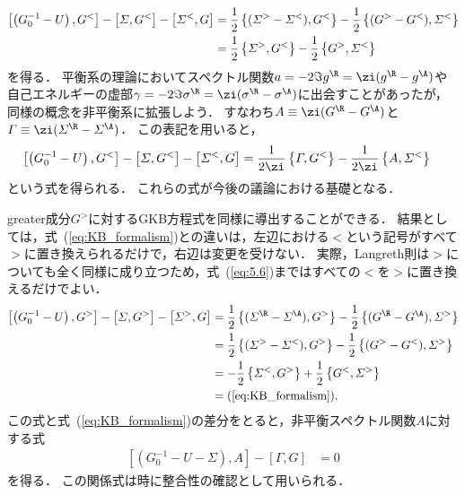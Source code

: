 \documentclass[a4paper,10pt]{jsarticle}
\begin{document}
\begin{align}
\left[ \left( G_0^{-1} - U \right), G^{<} \right]
	- \left[ \varSigma, G^{<} \right]
	- \left[ \varSigma^{<}, G \right]
	& = \frac{1}{2} \left\{ ( \varSigma^{>} - \varSigma^{<} ), G^{<} \right\}
		- \frac{1}{2} \left\{ ( G^{>} - G^{<} ), \varSigma^{<} \right\}
\notag \\
	& = \frac{1}{2} \left\{ \varSigma^{>}, G^{<} \right\}
		- \frac{1}{2} \left\{ G^{>}, \varSigma^{<} \right\}
\label{eq:KB_formalism}
\end{align}
を得る．
平衡系の理論においてスペクトル関数$a = - 2 \Im g^{\R} = \zi ( g^{\R} - g^{\A} )$や自己エネルギーの虚部$\gamma = - 2 \Im \sigma^{\R} = \zi (\sigma^{\R} - \sigma^{\A})$に出会すことがあったが，同様の概念を非平衡系に拡張しよう．
すなわち$A \equiv \zi (G^{\R} - G^{\A})$と$\varGamma \equiv \zi (\varSigma^{\R} - \varSigma^{\A})$．
この表記を用いると，
\begin{align*}
\left[ \left( G_0^{-1} - U \right), G^{<} \right]
	- \left[ \varSigma, G^{<} \right]
	- \left[ \varSigma^{<}, G \right]
	& = \frac{1}{2\zi} \left\{ \varGamma, G^{<} \right\}
		- \frac{1}{2\zi} \left\{ A, \varSigma^{<} \right\}
\end{align*}
という式を得られる．
これらの式が今後の議論における基礎となる．

greater成分$G^{>}$に対するGKB方程式を同様に導出することができる．
結果としては，式~(\ref{eq:KB_formalism})との違いは，左辺における$<$という記号がすべて$>$に置き換えられるだけで，右辺は変更を受けない．
実際，Langreth則は$>$についても全く同様に成り立つため，式~(\ref{eq:5.6})まではすべての$<$を$>$に置き換えるだけでよい．
\begin{align*}
\left[ \left( G_0^{-1} - U \right), G^{>} \right]
	- \left[ \varSigma, G^{>} \right]
	- \left[ \varSigma^{>}, G \right]
	& = \frac{1}{2} \left\{ ( \varSigma^{\R} - \varSigma^{\A} ), G^{>} \right\}
		- \frac{1}{2} \left\{ ( G^{\R} - G^{\A} ), \varSigma^{>} \right\}
\\	& = \frac{1}{2} \left\{ ( \varSigma^{>} - \varSigma^{<} ), G^{>} \right\}
		- \frac{1}{2} \left\{ ( G^{>} - G^{<} ), \varSigma^{>} \right\}
\\	& = - \frac{1}{2} \left\{ \varSigma^{<}, G^{>} \right\}
		+ \frac{1}{2} \left\{ G^{<}, \varSigma^{>} \right\}
\\	& = \text{(\ref{eq:KB_formalism})}	
.\end{align*}
この式と式~(\ref{eq:KB_formalism})の差分をとると，非平衡スペクトル関数$A$に対する式
\begin{align}
\left[ \left( G_0^{-1} - U - \varSigma \right), A \right]
	- \left[ \varGamma, G \right]
	& = 0
\end{align}
を得る．
この関係式は時に整合性の確認として用いられる．
\end{document}
